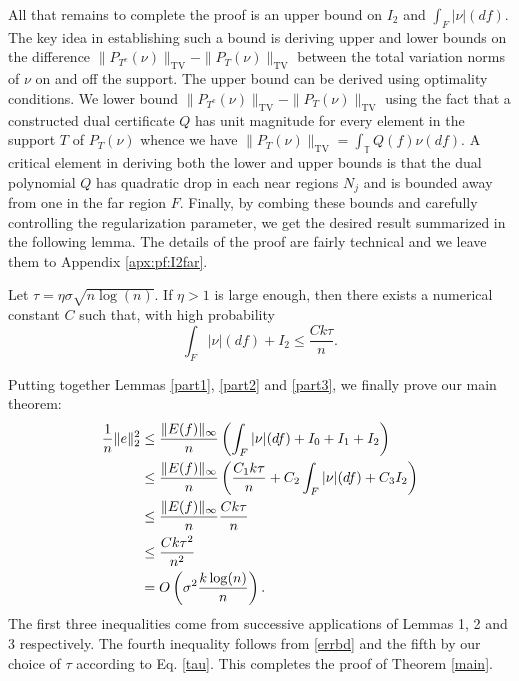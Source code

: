 All that remains to complete the proof is an upper bound on $I_2$ and $\int_F{|\nu|(df)}$.  The key idea in establishing such a bound is deriving upper and lower bounds on the
difference $\| P_{T^c} ( \nu) \|_{{\mathrm{TV}}} - \| P_T ( \nu) \|_{{\mathrm{TV}}}$
between the total variation norms of $\nu$ on and off the support. The upper bound can be derived using optimality conditions. We lower bound $\| P_{T^c} ( \nu)
\|_{{\mathrm{TV}}} - \| P_{T} ( \nu) \|_{{\mathrm{TV}}}$ using the fact that a constructed dual
certificate $Q$ has unit magnitude for every element in the support
$T$ of $P_T ( \nu)$ whence we have $\| P_T ( \nu) \|_{{\mathrm{TV}}} = \int_{\mathbb{T}}
Q ( f) \nu ( d f)$. A critical element in deriving both the lower and upper bounds is that the dual polynomial $Q$ has quadratic drop in each near regions $N_j$ and is bounded away from one in the far region $F$. Finally, by combing these bounds and carefully controlling the regularization parameter, we get the desired result summarized in the following lemma. The details of the proof are fairly technical and we leave them to Appendix \ref{apx:pf:I2far}.

\begin{lemma}
Let $\tau = \eta\sigma \sqrt{n\log(n)}$. If $\eta>1$ is large enough, then there exists a numerical constant $C$ such that, with high probability
\label{part3}
\[
\int_F{|\nu|(df)} + I_2 \leq \frac{C k \tau}{n}.
\]
\end{lemma}

Putting together Lemmas \ref{part1}, \ref{part2} and \ref{part3}, we finally prove our main theorem:
\begin{align*}
\frac{1}{n}\lVert e\rVert_2^2 
&\leq \frac{\lVert E(f)\rVert_\infty}{n} \left(\int_F{|\nu|(df)} + I_0 + I_1 + I_2\right)\\
&\leq \frac{\lVert E(f)\rVert_\infty}{n} \left(\frac{C_1 k \tau}{n} + C_2 \int_F{|\nu|(df)} + C_3 I_2\right)\\
&\leq  \frac{\lVert E(f)\rVert_\infty}{n} \frac{C k \tau}{n} \\
& \leq \frac{C k \tau^2}{n^2}\\
&= O\left(\sigma^2\frac{k \log(n)}{n}\right).
\end{align*}
The first three inequalities come from successive applications of Lemmas 1, 2 and 3 respectively. The fourth inequality follows from \eqref{errbd} and the fifth by our choice of $\tau$ according to Eq. \eqref{tau}. This completes the proof of Theorem \ref{main}.



